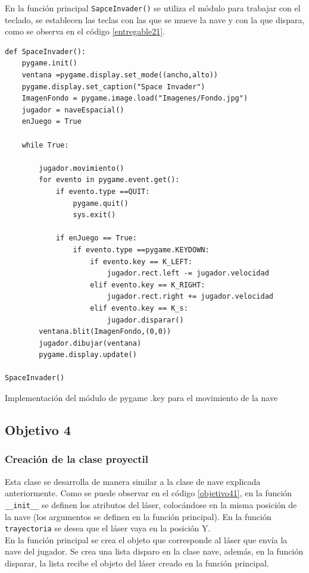 \documentclass[12pt,letterpaper]{article}
\begin{document}
En la función principal \texttt{SapceInvader()} se utiliza el módulo para trabajar con el teclado, se establecen las teclas con las que se mueve la nave y con la que dispara, como se observa en el código \ref{entregable21}.

\begin{listing}[H]
\begin{verbatim}
def SpaceInvader():
    pygame.init()
    ventana =pygame.display.set_mode((ancho,alto))
    pygame.display.set_caption("Space Invader")
    ImagenFondo = pygame.image.load("Imagenes/Fondo.jpg")
    jugador = naveEspacial()
    enJuego = True

    while True:

        jugador.movimiento()
        for evento in pygame.event.get():
            if evento.type ==QUIT:
                pygame.quit()
                sys.exit()

            if enJuego == True:
                if evento.type ==pygame.KEYDOWN:
                    if evento.key == K_LEFT:
                        jugador.rect.left -= jugador.velocidad
                    elif evento.key == K_RIGHT:
                        jugador.rect.right += jugador.velocidad
                    elif evento.key == K_s:
                        jugador.disparar()
        ventana.blit(ImagenFondo,(0,0))
        jugador.dibujar(ventana)        
        pygame.display.update()

SpaceInvader()
\end{verbatim}
\caption{Implementación del módulo de pygame .key para el movimiento de la nave}
\label{entregable21}

\end{listing}


\subsection{Objetivo 4} 
\subsubsection{Creación de la clase proyectil} \label{objetivo4}
Esta clase se desarrolla de manera similar a la clase de nave explicada anteriormente. Como se puede observar en el código \ref{objetivo41}, en la función \texttt{\_\_init\_\_} se definen los atributos del láser, colocándose en la misma posición de la nave (los argumentos se definen en la función principal). En la función \texttt{trayectoria} se desea que el láser vaya en la posición Y. \vspace{5mm}\\
\indent En la función principal se crea el objeto que corresponde al láser que envía la nave del jugador. 
Se crea una lista disparo en la clase nave, además, en la función disparar, la lista recibe el objeto del láser creado en la función principal.
\end{document}
